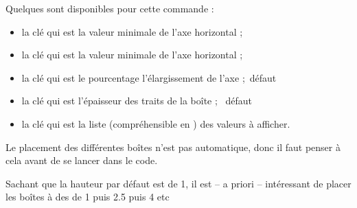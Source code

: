\begin{PresCodePL}{}
\end{PresCodePL}

\begin{PresCodePL}{}
\end{PresCodePL}

\begin{cautionblock}
Quelques  sont disponibles pour cette commande :

\begin{itemize}
	\item la clé  qui est la valeur minimale de l'axe horizontal ;
	\item la clé  qui est la valeur minimale de l'axe horizontal ;
	\item la clé  qui est le pourcentage l'élargissement de l'axe ;\hfill~défaut 
	\item la clé  qui est l'épaisseur des traits de la boîte ; \hfill~défaut 
	\item la clé  qui est la liste (compréhensible en \TikZ) des valeurs à afficher.
\end{itemize}
\vspace*{-\baselineskip}\leavevmode
\end{cautionblock}

\begin{PresCodePL}{}
\end{PresCodePL}

\begin{noteblock}
Le placement des différentes boîtes n'est pas automatique, donc il faut penser à cela avant de se lancer dans le code.

Sachant que la hauteur par défaut est de 1, il est -- a priori -- intéressant de placer les boîtes à des  de \num{1} puis \num{2.5} puis \num{4} etc
\end{noteblock}

